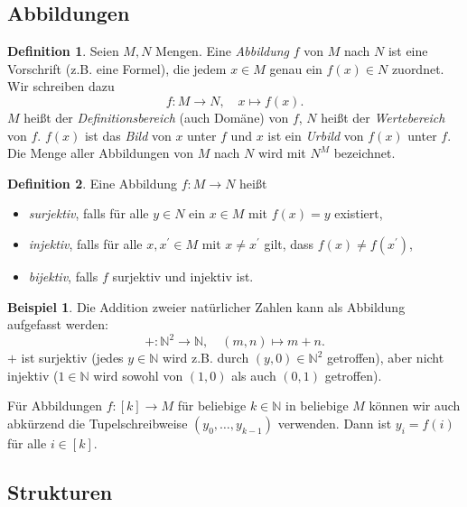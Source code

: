 \documentclass[11pt, a4paper]{article}
\theoremstyle{definition}
\newtheorem{definition}{Definition}[section]
\newtheorem*{example*}{Beispiel}
\theoremstyle{plain}
\numberwithin{equation}{section}
\begin{document}
\subsection{Abbildungen}\label{sec:pre_mappings}
\begin{definition}
	Seien \( M, N \) Mengen. Eine \textit{Abbildung} \( f \) von \( M \) nach \( N \) ist eine Vorschrift (z.B. eine Formel), die jedem \( x \in M \) genau ein \( f(x) \in N \) zuordnet. Wir schreiben dazu
	\[
		f\colon M \to N, \quad x \mapsto f(x).
	\]
	\( M \) heißt der \textit{Definitionsbereich} (auch Domäne) von \( f \), \( N \) heißt der \textit{Wertebereich} von \( f \). \( f(x) \) ist das \textit{Bild} von \( x \) unter \( f \) und \( x \) ist ein \textit{Urbild} von \( f(x) \) unter \( f \). Die Menge aller Abbildungen von \( M \) nach \( N \) wird mit \( N^M \) bezeichnet. 
\end{definition}

\begin{definition}
	Eine Abbildung \( f\colon M \to N \) heißt
	\begin{itemize}
		\item \textit{surjektiv}, falls für alle \( y \in N \) ein \( x \in M \) mit \( f(x) = y \) existiert,
		\item \textit{injektiv}, falls für alle \( x, x^\prime \in M \) mit \( x \neq x^\prime \) gilt, dass \( f(x) \neq f(x^\prime) \),
		\item \textit{bijektiv}, falls \( f \) surjektiv und injektiv ist.
	\end{itemize}
\end{definition}
\begin{example*}
	Die Addition zweier natürlicher Zahlen kann als Abbildung aufgefasst werden:
	\[
		+\colon \mathbb{N}^2 \to \mathbb{N}, \quad (m, n) \mapsto m+n.
	\]
	\( + \) ist surjektiv (jedes \( y \in \mathbb{N} \) wird z.B. durch \( (y, 0) \in \mathbb{N}^2 \) getroffen), aber nicht injektiv (\( 1 \in \mathbb{N} \) wird sowohl von \( (1, 0) \) als auch \( (0, 1) \) getroffen).
\end{example*}
Für Abbildungen \( f\colon [k] \to M \) für beliebige \( k \in \mathbb{N} \) in beliebige \( M \) können wir auch abkürzend die Tupelschreibweise \( (y_0, \ldots, y_{k-1}) \) verwenden. Dann ist \( y_i = f(i) \) für alle \( i \in [k] \).


\subsection{Strukturen}\label{sec:pre_structures}
\end{document}
